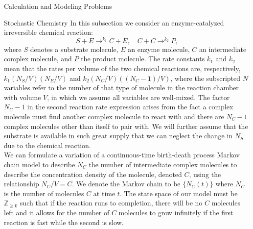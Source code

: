 \documentclass[12pt]{article}
\numberwithin{equation}{section}
\begin{document}
\begin{section}{Calculation and Modeling Problems}

    \begin{subsection}{Stochastic Chemistry}
    In this subsection we consider an enzyme-catalyzed irreversible chemical reaction:
    $$S+E\rightarrow^{k_1}C+E,\quad C+C\rightarrow^{k_2}P,$$
    where $S$ denotes a substrate molecule, $E$ an enzyme molecule, $C$ an intermediate complex molecule, and $P$ the product molecule. The rate constants $k_1$ and $k_2$ mean that the rates per volume of the two chemical reactions are, respectively, $k_1(N_S/V)(N_E/V)$ and $k_2(N_C/V)((N_C-1)/V)$, where the subscripted $N$ variables refer to the number of that type of molecule in the reaction chamber with volume $V$, in which we assume all variables are well-mixed. The factor $N_C-1$ in the second reaction rate expression arises from the fact a complex molecule must find another complex molecule to react with and there are $N_C-1$ complex molecules other than itself to pair with. We will further assume that the substrate is available in such great supply that we can neglect the change in $N_S$ due to the chemical reaction.\\

    We can formulate a variation of a continuous-time birth-death process Markov chain model to describe $N_C$ the number of intermediate complex molecules to describe the concentration density of the molecule, denoted $C$, using the relationship $N_C/V=C$. We denote the Markov chain to be $\{N_C(t)\}$ where $N_C$ is the number of molecules $C$ at time $t$. The state space of our model must be $\mathbb{Z}_{\geq 0}$ such that if the reaction runs to completion, there will be no $C$ molecules left and it allows for the number of $C$ molecules to grow infinitely if the first reaction is fast while the second is slow.\\


\end{subsection}
\end{section}
\end{document}
